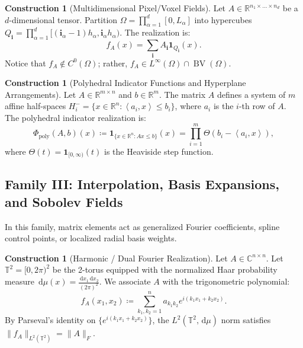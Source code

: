\documentclass[11pt,a4paper,reqno]{amsart}
\theoremstyle{definition}
\newtheorem{construction}[theorem]{Construction}
\numberwithin{equation}{section}
\providecommand{\R}{\mathbb{R}}
\newcommand{\C}{\mathbb{C}}
\newcommand{\Tor}{\mathbb{T}}
\providecommand{\BV}{\operatorname{BV}}
\newcommand{\inner}[2]{\left\langle #1, #2 \right\rangle}
\newcommand{\dif}{\,\mathrm{d}}
\providecommand{\R}{\mathbb{R}}
\providecommand{\BV}{\mathrm{BV}}
\begin{document}
\begin{construction}[Multidimensional Pixel/Voxel Fields]
Let $A \in \R^{n_1 \times \dots \times n_d}$ be a $d$-dimensional tensor. Partition $\Omega = \prod_{\alpha=1}^d [0, L_\alpha]$ into hypercubes $Q_{\mathbf{i}} = \prod_{\alpha=1}^d [(\mathbf{i}_\alpha-1) h_\alpha, \mathbf{i}_\alpha h_\alpha)$. The realization is:
\begin{equation}
    f_A(x) = \sum_{\mathbf{i}} A_{\mathbf{i}} \mathbf{1}_{Q_{\mathbf{i}}}(x).
\end{equation}
Notice that $f_A \notin C^0(\Omega)$; rather, $f_A \in L^\infty(\Omega) \cap \BV(\Omega)$.
\end{construction}

\begin{construction}[Polyhedral Indicator Functions and Hyperplane Arrangements]
Let $A \in \R^{m \times n}$ and $b \in \R^m$. The matrix $A$ defines a system of $m$ affine half-spaces $H_i^- = \{x \in \R^n \colon \inner{a_i}{x} \le b_i\}$, where $a_i$ is the $i$-th row of $A$. The polyhedral indicator realization is:
\begin{equation}
    \Phi_{\mathrm{poly}}(A, b)(x) \coloneqq \mathbf{1}_{\{x \in \R^n \colon Ax \le b\}}(x) = \prod_{i=1}^m \Theta(b_i - \inner{a_i}{x}),
\end{equation}
where $\Theta(t) = \mathbf{1}_{[0, \infty)}(t)$ is the Heaviside step function.
\end{construction}

\subsection{Family III: Interpolation, Basis Expansions, and Sobolev Fields}
\label{subsec:fam3}

In this family, matrix elements act as generalized Fourier coefficients, spline control points, or localized radial basis weights.

\begin{construction}[Harmonic / Dual Fourier Realization]
Let $A \in \C^{n \times n}$. Let $\Tor^2 = [0, 2\pi)^2$ be the 2-torus equipped with the normalized Haar probability measure $\dif\mu(x) = \frac{\dif x_1 \dif x_2}{(2\pi)^2}$. We associate $A$ with the trigonometric polynomial:
\begin{equation}
    \label{eq:fourier_realization}
    f_A(x_1, x_2) \coloneqq \sum_{k_1, k_2 = 1}^n a_{k_1 k_2} e^{i (k_1 x_1 + k_2 x_2)}.
\end{equation}
By Parseval's identity on $\{e^{i(k_1 x_1 + k_2 x_2)}\}$, the $L^2(\Tor^2, \dif\mu)$ norm satisfies $\|f_A\|_{L^2(\Tor^2)} = \|A\|_F$.
\end{construction}
\end{document}
